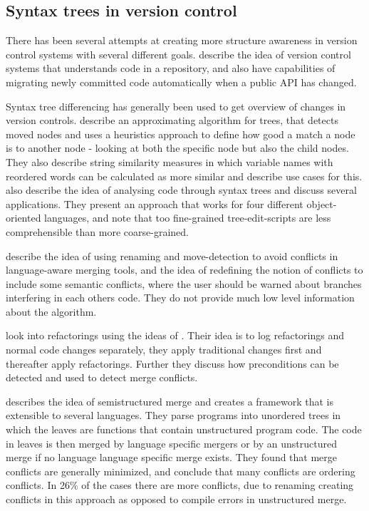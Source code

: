 \documentclass[11pt]{article}
\begin{document}
\subsection{Syntax trees in version control}
\label{SyntaxTreesVersionControl}
There has been several attempts at creating more structure awareness in version control systems with several different goals. \citet{Freese} describe the idea of version control systems that understands code in a repository, and also have capabilities of migrating newly committed code automatically when a public API has changed.

Syntax tree differencing has generally been used to get overview of changes in version controls. \citet{Fluri} describe an approximating algorithm for trees, that  detects moved nodes and uses a heuristics approach to define how good a match a node is to another node - looking at both the specific node but also the child nodes. They also describe string similarity measures in which variable names with reordered words can be calculated as more similar and describe use cases for this. \citet{Hashimoto} also describe the idea of analysing code through syntax trees and discuss several applications. They present an approach that works for four different object-oriented languages, and note that too fine-grained tree-edit-scripts are less comprehensible than more coarse-grained.

\citet{Hunt} describe the idea of using renaming and move-detection to avoid conflicts in language-aware merging tools, and the idea of redefining the notion of conflicts to include some semantic conflicts, where the user should be warned about branches interfering in each others code. They do not provide much low level information about the algorithm.

\citet{Ekman} look into refactorings using the ideas of \citet{Lippe}. Their idea is to log refactorings and normal code changes separately, they apply traditional changes first and thereafter apply refactorings. Further they discuss how preconditions can be detected and used to detect merge conflicts.

\citet{Apel} describes the idea of semistructured merge and creates a framework that is extensible to several languages. They parse programs into unordered trees in which the leaves are functions that contain unstructured program code. The code in leaves is then merged by language specific mergers or by an unstructured merge if no language language specific merge exists. They found that merge conflicts are generally minimized, and conclude that many conflicts are ordering conflicts. In 26\% of the cases there are more conflicts, due to renaming creating conflicts in this approach as opposed to compile errors in unstructured merge.
\end{document}
